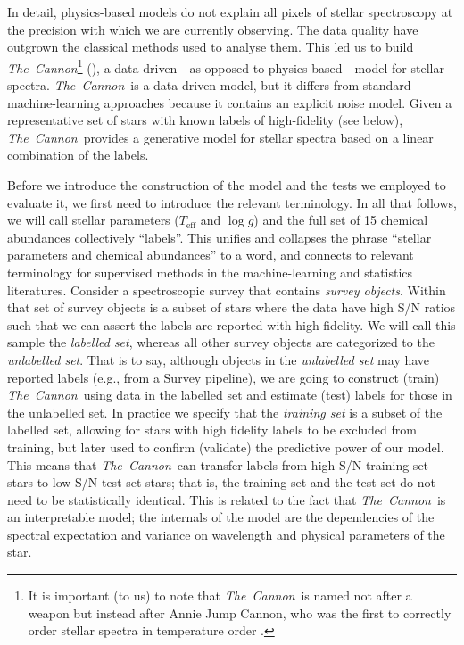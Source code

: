 \documentclass[12pt,preprint]{aastex}
\newcommand{\project}[1]{\textsl{#1}}
\newcommand{\TheCannon}{\project{The~Cannon}}
\newcommand{\logg}{\log g}
\newcommand{\Teff}{T_{\mathrm{eff}}}
\begin{document}
In detail, physics-based models do not explain all pixels of stellar 
spectroscopy at the precision with which we are currently observing.  The data
quality have outgrown the classical methods used to analyse them.  This led us 
to build \TheCannon\footnote{It is important (to us) to note that \TheCannon\ 
is named not after a weapon but instead after Annie Jump Cannon, who was the 
first to correctly order stellar spectra in temperature order \citep[and who did
so by looking at the data, and without any use of physics-based models, see][]
{Cannon_1911}.} (\citealt{tc}), a data-driven---as opposed to 
physics-based---model for stellar spectra.  \TheCannon\ is a data-driven model, 
but it differs from standard machine-learning approaches because it contains an 
explicit noise model. Given a representative set of stars with known labels of 
high-fidelity (see below), \TheCannon\ provides a generative model for stellar 
spectra based on a linear combination of the labels.  


Before we introduce the construction of the model and the tests we employed to
evaluate it, we first need to introduce the relevant terminology.  In all that 
follows, we will call stellar parameters ($\Teff$ and $\logg$) and the full set
of 15 chemical abundances collectively ``labels''.  This unifies and collapses 
the phrase ``stellar parameters and chemical abundances'' to a word, and 
connects to relevant terminology for supervised methods in the machine-learning
and statistics literatures.  Consider a spectroscopic survey that contains 
\emph{survey objects}.  Within that set of survey objects is a subset of stars 
where the data have high S/N ratios such that we can assert the labels are 
reported with high fidelity.  We will call this sample the \emph{labelled set}, 
whereas all other survey objects are categorized to the \emph{unlabelled set}.  
That is to say, although objects in the \emph{unlabelled set} may have reported 
labels (e.g., from a Survey pipeline), we are going to construct (train) 
\TheCannon\ using data in the labelled set and estimate (test) labels for those
in the unlabelled set.  In practice we specify that the \emph{training set} is
a subset of the labelled set, allowing for stars with high fidelity labels to be
excluded from training, but later used to confirm (validate) the 
predictive power of our model.  This means that \TheCannon\ can transfer labels
from high S/N training set stars to low S/N test-set stars; that is, the 
training set and the test set do not need to be statistically identical.  This 
is related to the fact that \TheCannon\ is an interpretable model; the internals
of the model are the dependencies of the spectral expectation and variance on
wavelength and physical parameters of the star. 
\end{document}
